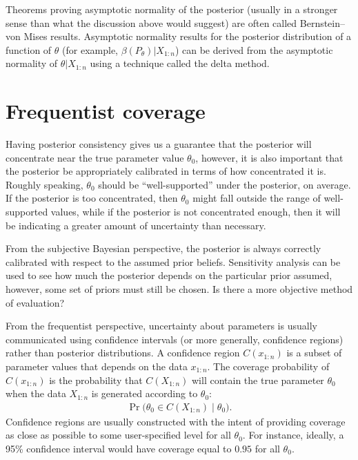 \documentclass[12pt]{article}
\begin{document}
Theorems proving asymptotic normality of the posterior (usually in a stronger sense than what the discussion above would suggest) are often called Bernstein--von Mises results.  
Asymptotic normality results for the posterior distribution of a function of $\theta$ (for example, $\beta(P_\theta)|X_{1:n}$) can be derived from the asymptotic normality of $\theta | X_{1:n}$ using a technique called the delta method.





\section{Frequentist coverage}

Having posterior consistency gives us a guarantee that the posterior will concentrate near the true parameter value $\theta_0$, however, it is also important that the posterior be appropriately calibrated in terms of how concentrated it is. 
Roughly speaking, $\theta_0$ should be ``well-supported'' under the posterior, on average. %
If the posterior is too concentrated, then $\theta_0$ might fall outside the range of well-supported values, while if the posterior is not concentrated enough, then it will be indicating a greater amount of uncertainty than necessary.

From the subjective Bayesian perspective, the posterior is always correctly calibrated with respect to the assumed prior beliefs. Sensitivity analysis can be used to see how much the posterior depends on the particular prior assumed, however, some set of priors must still be chosen. Is there a more objective method of evaluation?

From the frequentist perspective, uncertainty about parameters is usually communicated using confidence intervals (or more generally, confidence regions) rather than posterior distributions. 
A confidence region  $C(x_{1:n})$ is a subset of parameter values that depends on the data $x_{1:n}$. The coverage probability of $C(x_{1:n})$ is the probability that $C(X_{1:n})$ will contain the true parameter $\theta_0$ when the data $X_{1:n}$ is generated according to $\theta_0$:
\begin{align} \label{equation:coverage}
\Pr\big(\theta_0 \in C(X_{1:n}) \;\big\vert\; \theta_0).
\end{align}
Confidence regions are usually constructed with the intent of providing coverage as close as possible to some user-specified level for all $\theta_0$. For instance, ideally, a 95\% confidence interval would have coverage equal to $0.95$ for all $\theta_0$.
\end{document}
